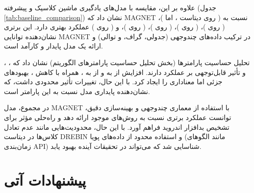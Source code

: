 علاوه بر این، مقایسه با مدل‌های یادگیری ماشین کلاسیک و پیشرفته (جدول \ref{tab:baseline_comparison}) نشان داد که MAGNET نسبت به  (  روی دیتاست ، اما  )،  (  روی )،  (  روی )،  (  روی )،  (  روی )، و  (  روی ) عملکرد بهتری دارد. این برتری نشان‌دهنده توانایی MAGNET در ترکیب داده‌های چندوجهی (جدولی، گراف، و توالی) و ارائه یک مدل پایدار و کارآمد است.

تحلیل حساسیت پارامترها (بخش تحلیل حساسیت پارامترهای الگوریتم) نشان داد که ، ، و  تأثیر قابل‌توجهی بر عملکرد دارند. افزایش  از  به  و  از  به ، همراه با کاهش ، بهبودهای جزئی اما معناداری را ایجاد کرد. با این حال، تغییرات  تأثیر محدودی داشت، که نشان‌دهنده پایداری مدل نسبت به این پارامتر است.

در مجموع، مدل MAGNET با استفاده از معماری چندوجهی و بهینه‌سازی دقیق، توانست عملکرد برتری نسبت به روش‌های موجود ارائه دهد و راه‌حلی مؤثر برای تشخیص بدافزار اندروید فراهم آورد. با این حال، محدودیت‌هایی مانند عدم تعادل کلاس‌ها در دیتاست DREBIN و استفاده محدود از داده‌های پویا (مانند الگوهای زمان‌بندی API) شناسایی شد که می‌تواند در تحقیقات آینده بهبود یابد.

\section{پیشنهادات آتی}
